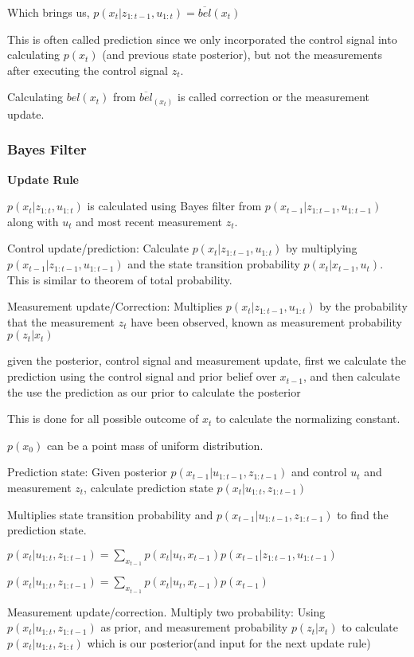 \documentclass{article}
\begin{document}
Which brings us,
$p(x_t |z_{1:t-1}, u_{1:t}) = \overline{bel}(x_t)$

This is often called prediction since we only incorporated the control signal into calculating $p(x_t)$ (and previous state posterior), but not the measurements after executing the control signal $z_t$.

Calculating $bel(x_t)$ from $\overline{bel}_(x_t)$ is called correction or the measurement update.

\subsubsection{Bayes Filter}

\textbf{Update Rule}

$p(x_t |z_{1:t}, u_{1:t})$ is calculated using Bayes filter from $p(x_{t-1} |z_{1:t-1}, u_{1:t-1})$ along with $u_t$ and most recent measurement $z_t$.

Control update/prediction: Calculate $p(x_t |z_{1:t-1}, u_{1:t})$ by multiplying $p(x_{t-1} |z_{1:t-1}, u_{1:t-1})$ and the state transition probability $p(x_t | x_{t-1}, u_t)$. This is similar to theorem of total probability.

Measurement update/Correction: Multiplies $p(x_t |z_{1:t-1}, u_{1:t})$ by the probability that the measurement $z_t$ have been observed, known as measurement probability $p(z_t | x_t)$

given the posterior, control signal and measurement update, first we calculate the prediction using the control signal and prior belief over $x_{t-1}$, and then calculate the use the prediction as our prior to calculate the posterior 

This is done for all possible outcome of $x_t$ to calculate the normalizing constant.

$p(x_0)$ can be a point mass of uniform distribution.

Prediction state: Given posterior $p(x_{t-1} | u_{1:t-1}, z_{1:t-1})$ and control $u_t$ and measurement $z_t$, calculate prediction state $p(x_t | u_{1:t}, z_{1:t-1})$

Multiplies state transition probability and $p(x_{t-1} | u_{1:t-1}, z_{1:t-1})$ to find the prediction state.

$p(x_t | u_{1:t}, z_{1:t-1}) = \sum_{x_{t-1}} p(x_t | u_t, x_{t-1}) p(x_{t-1} | z_{1:t-1}, u_{1:t-1})$

$p(x_t | u_{1:t}, z_{1:t-1}) = \sum_{x_{t-1}} p(x_t | u_t, x_{t-1}) p(x_{t-1})$

Measurement update/correction. Multiply two probability: Using $p(x_t | u_{1:t}, z_{1:t-1})$ as prior, and measurement probability $p(z_t | x_t)$ to calculate $p(x_t | u_{1:t}, z_{1:t})$ which is our posterior(and input for the next update rule)
\end{document}
